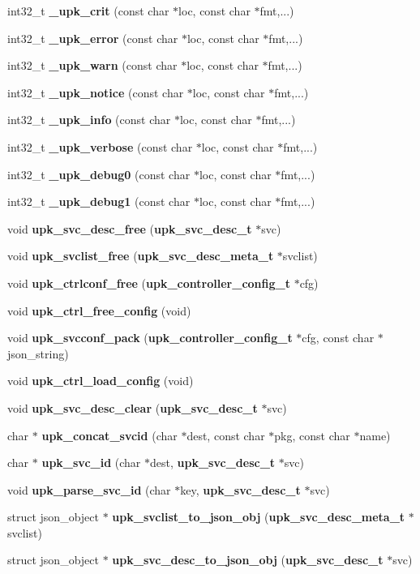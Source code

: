 \begin{DoxyCompactItemize}
\item 
int32\_\-t {\bf \_\-upk\_\-crit} (const char $\ast$loc, const char $\ast$fmt,...)
\item 
int32\_\-t {\bf \_\-upk\_\-error} (const char $\ast$loc, const char $\ast$fmt,...)
\item 
int32\_\-t {\bf \_\-upk\_\-warn} (const char $\ast$loc, const char $\ast$fmt,...)
\item 
int32\_\-t {\bf \_\-upk\_\-notice} (const char $\ast$loc, const char $\ast$fmt,...)
\item 
int32\_\-t {\bf \_\-upk\_\-info} (const char $\ast$loc, const char $\ast$fmt,...)
\item 
int32\_\-t {\bf \_\-upk\_\-verbose} (const char $\ast$loc, const char $\ast$fmt,...)
\item 
int32\_\-t {\bf \_\-upk\_\-debug0} (const char $\ast$loc, const char $\ast$fmt,...)
\item 
int32\_\-t {\bf \_\-upk\_\-debug1} (const char $\ast$loc, const char $\ast$fmt,...)
\item 
void {\bf upk\_\-svc\_\-desc\_\-free} ({\bf upk\_\-svc\_\-desc\_\-t} $\ast$svc)
\item 
void {\bf upk\_\-svclist\_\-free} ({\bf upk\_\-svc\_\-desc\_\-meta\_\-t} $\ast$svclist)
\item 
void {\bf upk\_\-ctrlconf\_\-free} ({\bf upk\_\-controller\_\-config\_\-t} $\ast$cfg)
\item 
void {\bf upk\_\-ctrl\_\-free\_\-config} (void)
\item 
void {\bf upk\_\-svcconf\_\-pack} ({\bf upk\_\-controller\_\-config\_\-t} $\ast$cfg, const char $\ast$json\_\-string)
\item 
void {\bf upk\_\-ctrl\_\-load\_\-config} (void)
\item 
void {\bf upk\_\-svc\_\-desc\_\-clear} ({\bf upk\_\-svc\_\-desc\_\-t} $\ast$svc)
\item 
char $\ast$ {\bf upk\_\-concat\_\-svcid} (char $\ast$dest, const char $\ast$pkg, const char $\ast$name)
\item 
char $\ast$ {\bf upk\_\-svc\_\-id} (char $\ast$dest, {\bf upk\_\-svc\_\-desc\_\-t} $\ast$svc)
\item 
void {\bf upk\_\-parse\_\-svc\_\-id} (char $\ast$key, {\bf upk\_\-svc\_\-desc\_\-t} $\ast$svc)
\item 
struct json\_\-object $\ast$ {\bf upk\_\-svclist\_\-to\_\-json\_\-obj} ({\bf upk\_\-svc\_\-desc\_\-meta\_\-t} $\ast$svclist)
\item 
struct json\_\-object $\ast$ {\bf upk\_\-svc\_\-desc\_\-to\_\-json\_\-obj} ({\bf upk\_\-svc\_\-desc\_\-t} $\ast$svc)

\end{DoxyCompactItemize}
